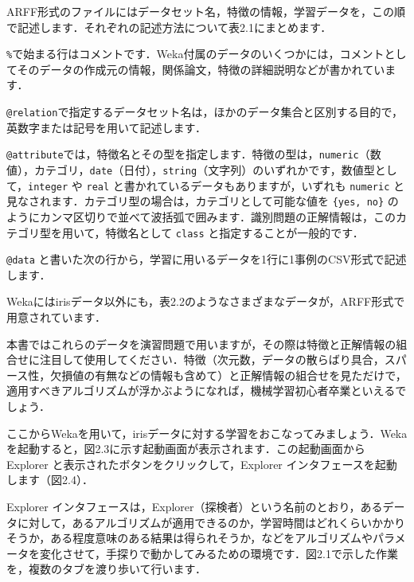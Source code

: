 
ARFF形式のファイルにはデータセット名，特徴の情報，学習データを，この順で記述します．それぞれの記述方法について表2.1にまとめます．


{\tt \%}で始まる行はコメントです．Weka付属のデータのいくつかには，コメントとしてそのデータの作成元の情報，関係論文，特徴の詳細説明などが書かれています．

{\tt @relation}で指定するデータセット名は，ほかのデータ集合と区別する目的で，英数字または記号を用いて記述します．

{\tt @attribute}では，特徴名とその型を指定します．特徴の型は，{\tt numeric}（数値），カテゴリ，{\tt date}（日付），{\tt string}（文字列）のいずれかです，数値型として，{\tt integer} や {\tt real} と書かれているデータもありますが，いずれも {\tt numeric} と見なされます．カテゴリ型の場合は，カテゴリとして可能な値を {\tt \{yes, no\}} のようにカンマ区切りで並べて波括弧で囲みます．識別問題の正解情報は，このカテゴリ型を用いて，特徴名として {\tt class} と指定することが一般的です．

{\tt @data} と書いた次の行から，学習に用いるデータを1行に1事例のCSV形式で記述します．


Wekaにはirisデータ以外にも，表2.2のようなさまざまなデータが，ARFF形式で用意されています．


本書ではこれらのデータを演習問題で用いますが，その際は特徴と正解情報の組合せに注目して使用してください．特徴（次元数，データの散らばり具合，スパース性，欠損値の有無などの情報も含めて）と正解情報の組合せを見ただけで，適用すべきアルゴリズムが浮かぶようになれば，機械学習初心者卒業といえるでしょう．


ここからWekaを用いて，irisデータに対する学習をおこなってみましょう．Wekaを起動すると，図2.3に示す起動画面が表示されます．この起動画面から Explorer と表示されたボタンをクリックして，Explorer インタフェースを起動します（図2.4）．



Explorer インタフェースは，Explorer（探検者）という名前のとおり，あるデータに対して，あるアルゴリズムが適用できるのか，学習時間はどれくらいかかりそうか，ある程度意味のある結果は得られそうか，などをアルゴリズムやパラメータを変化させて，手探りで動かしてみるための環境です．図2.1で示した作業を，複数のタブを渡り歩いて行います．

